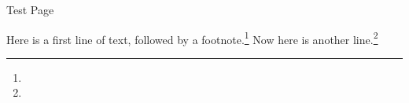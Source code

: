 \documentclass[../main/main.tex]{subfiles}
\begin{document}
\englishtitlesize Test Page\par
\vspace{\afterchapskip}
\noindent
\englishsize Here is a first line of text, followed by a footnote.\footnote{\blindtext} Now here is another line.\footnote{\blindtext} \blindtext \blindtext\par
\blindtext \blindtext
\end{document}

